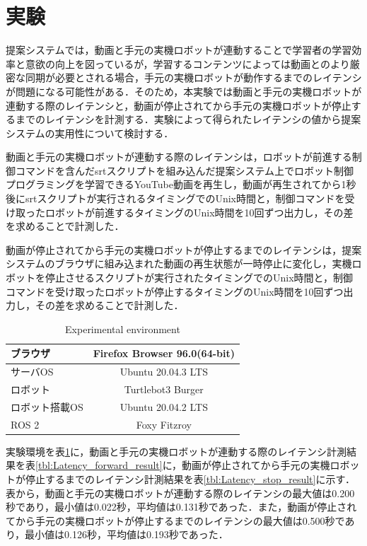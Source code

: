 \documentclass{ujarticle}
\begin{document}
\section{実験}
提案システムでは，動画と手元の実機ロボットが連動することで学習者の学習効率と意欲の向上を図っているが，学習するコンテンツによっては動画とのより厳密な同期が必要とされる場合，手元の実機ロボットが動作するまでのレイテンシが問題になる可能性がある．そのため，本実験では動画と手元の実機ロボットが連動する際のレイテンシと，動画が停止されてから手元の実機ロボットが停止するまでのレイテンシを計測する．実験によって得られたレイテンシの値から提案システムの実用性について検討する．
\par 動画と手元の実機ロボットが連動する際のレイテンシは，ロボットが前進する制御コマンドを含んだsrtスクリプトを組み込んだ提案システム上でロボット制御プログラミングを学習できるYouTube動画を再生し，動画が再生されてから1秒後にsrtスクリプトが実行されるタイミングでのUnix時間と，制御コマンドを受け取ったロボットが前進するタイミングのUnix時間を10回ずつ出力し，その差を求めることで計測した．
\par 動画が停止されてから手元の実機ロボットが停止するまでのレイテンシは，提案システムのブラウザに組み込まれた動画の再生状態が一時停止に変化し，実機ロボットを停止させるスクリプトが実行されたタイミングでのUnix時間と，制御コマンドを受け取ったロボットが停止するタイミングのUnix時間を10回ずつ出力し，その差を求めることで計測した．

\begin{table}[b]
 \caption{Experimental environment}
 \label{tbl:environment}
 \centering
 \footnotesize
 \begin{tabular}{|p{}|c|}
  \hline
	ブラウザ	&Firefox Browser 96.0(64-bit) \\\hline
	サーバOS	&Ubuntu 20.04.3 LTS \\\hline
	ロボット	&Turtlebot3 Burger \\\hline
	ロボット搭載OS	&Ubuntu 20.04.2 LTS \\\hline
	ROS	2 &Foxy Fitzroy \\\hline
 \end{tabular}
\end{table}

\par 実験環境を表\ref{tbl:environment}に，動画と手元の実機ロボットが連動する際のレイテンシ計測結果を表\ref{tbl:Latency_forward_result}に，動画が停止されてから手元の実機ロボットが停止するまでのレイテンシ計測結果を表\ref{tbl:Latency_stop_result}に示す．表から，動画と手元の実機ロボットが連動する際のレイテンシの最大値は0.200秒であり，最小値は0.022秒，平均値は0.131秒であった．また，動画が停止されてから手元の実機ロボットが停止するまでのレイテンシの最大値は0.500秒であり，最小値は0.126秒，平均値は0.193秒であった．
\end{document}
